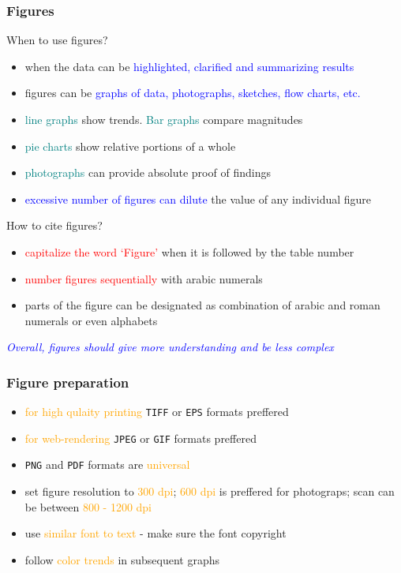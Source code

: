 \documentclass[newPxFont,sthlmFooter]{beamer}
\newcommand{\fs}{\footnotesize}
\begin{document}
\begin{frame}\frametitle{Figures}
\vspace{-0.75cm}
\begin{exampleblock}{\small When to use figures?}
  \begin{itemize}
  \fs
  \item when the data can be \textcolor{blue}{highlighted, clarified and summarizing results}
  \item figures can be \textcolor{blue}{graphs of data, photographs, sketches, flow charts, etc.}
  \item \textcolor{teal}{line graphs} show trends. \textcolor{teal}{Bar graphs} compare magnitudes
  \item \textcolor{teal}{pie charts} show relative portions of a whole
  \item \textcolor{teal}{photographs} can provide absolute proof of findings
  \item \textcolor{blue}{excessive number of figures can dilute} the value of any individual figure
  \end{itemize}
\end{exampleblock}

\begin{alertblock}{\small How to cite figures?}
  \begin{itemize}
  \fs
  \item \textcolor{red}{capitalize the word `Figure'} when it is followed by the table number
  \item \textcolor{red}{number figures sequentially} with arabic numerals
  \item parts of the figure can be designated as combination of arabic and roman numerals or even alphabets
  \end{itemize}
\end{alertblock}
\vspace{-0.5cm}
\begin{center}
\textcolor{blue}{\fs \it Overall, figures should give more understanding and be less complex}
\end{center}
\end{frame}

\begin{frame}\frametitle{Figure preparation}
  \begin{itemize}
  \fs
  \item \textcolor{orange}{for high qulaity printing} \texttt{TIFF} or \texttt{EPS} formats preffered
  \item \textcolor{orange}{for web-rendering} \texttt{JPEG} or \texttt{GIF} formats preffered
  \item \texttt{PNG} and \texttt{PDF} formats are \textcolor{orange}{universal}
  \item set figure resolution to \textcolor{orange}{300 dpi}; \textcolor{orange}{600 dpi} is preffered for photograps; scan can be between \textcolor{orange}{800 - 1200 dpi}
  \item use \textcolor{orange}{similar font to text} - make sure the font copyright
  \item follow \textcolor{orange}{color trends} in subsequent graphs
  \end{itemize}
\end{frame}
\end{document}
